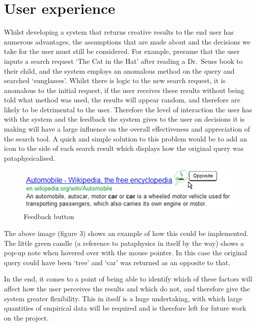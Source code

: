 \section{User experience}
Whilst developing a system that returns creative results to the end user has numerous advantages, the assumptions that are made about and the decisions we take for the user must still be considered. For example, presume that the user inputs a search request `The Cat in the Hat' after reading a Dr.\ Seuss book to their child, and the system employs an anomalous method on the query and searched `sunglasses'. Whilst there is logic to the new search request, it is anomalous to the initial request, if the user receives these results without being told what method was used, the results will appear random, and therefore are likely to be detrimental to the user. Therefore the level of interaction the user has with the system and the feedback the system gives to the user on decisions it is making will have a large influence on the overall effectiveness and appreciation of the search tool. A quick and simple solution to this problem would be to add an icon to the side of each search result which displays how the original query was pataphysicalised.

\begin{figure}[htb] %
  \centering
  \includegraphics[width=\linewidth]{images/resultexample}
\caption[Feedback button]{Feedback button}
\label{fig:feedback}
\end{figure}

The above image (figure 3) shows an example of how this could be implemented. The little green candle (a reference to pataphysics in itself by the way) shows a pop-up note when hovered over with the mouse pointer. In this case the original query could have been ‘tree’ and ‘car’ was returned as an opposite to that.

In the end, it comes to a point of being able to identify which of these factors will affect how the user perceives the results and which do not, and therefore give the system greater flexibility. This in itself is a huge undertaking, with which large quantities of empirical data will be required and is therefore left for future work on the project.

